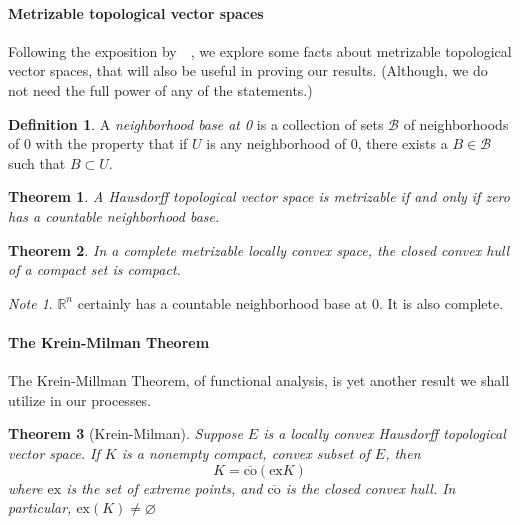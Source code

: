 \documentclass[12pt,letterpaper,final]{article}
\theoremstyle{plain}
\newtheorem{theorem}{Theorem}[section]
\theoremstyle{plain}
\theoremstyle{plain}
\theoremstyle{plain}
\theoremstyle{plain}
\theoremstyle{plain}
\theoremstyle{plain}
\theoremstyle{definition}
\newtheorem{definition}{Definition}[section]
\theoremstyle{definition}
\theoremstyle{definition}
\theoremstyle{definition}
\theoremstyle{definition}
\theoremstyle{remark}
\theoremstyle{remark}
\newtheorem*{note}{Note}
\theoremstyle{remark}
\theoremstyle{remark}
\begin{document}
\paragraph{Metrizable topological vector spaces}
\label{sec:metr-topol-vect}

Following the exposition by~\citeauthor{AlBo06}~\cite{AlBo06}, we explore some facts about
metrizable topological vector spaces, that will also be useful in
proving our results. (Although, we do not need the full power of any
of the statements.) 

\begin{definition}
  A \emph{neighborhood base at 0} is a collection of sets \(\mathcal{B}\)
  of neighborhoods of \(0\)  with the property that if \(U\)
  is any neighborhood of \(0\), there exists a \(B\in \mathcal{B}\)
  such that \(B\subset U\).
\end{definition}

\begin{theorem}
  A Hausdorff topological vector space is metrizable if and
  only if zero has a countable neighborhood base.
\end{theorem}

\begin{theorem}
  In a complete metrizable locally convex space, the closed convex
  hull of a compact set is compact.
\end{theorem}

\begin{note}
  \(\mathbb{R}^n\) certainly has a countable neighborhood base at
  0. It is also complete.
\end{note}

\paragraph{The Krein-Milman Theorem}

The Krein-Millman Theorem, of functional analysis, is yet another
result we shall utilize in our processes.

\begin{theorem}[Krein-Milman]\label{thm:krein-Millman}
  Suppose \(E\) is a locally convex Hausdorff topological vector space.
  If \(K\) is a nonempty compact, convex subset of \(E\), then
  \[
    K = \overline{\text{co}}\left(\text{ex}K\right)
  \]
  where \(\text{ex}\) is the set of extreme points, and
  \(\overline{\text{co}}\) is the closed convex hull.
  In particular, \(\text{ex}(K)\neq \varnothing\) 
\end{theorem}
\end{document}
